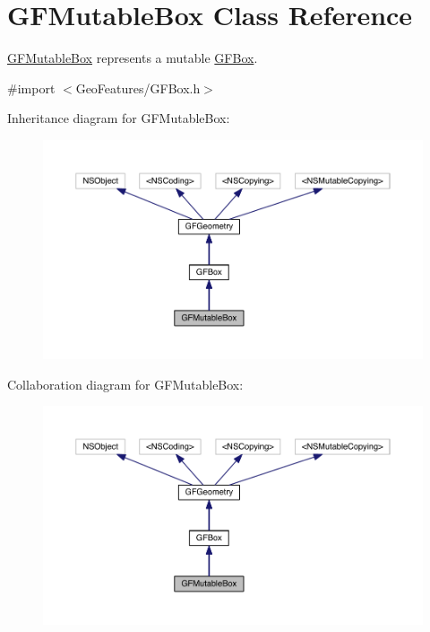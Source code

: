 \hypertarget{interface_g_f_mutable_box}{}\section{G\+F\+Mutable\+Box Class Reference}
\label{interface_g_f_mutable_box}


\hyperlink{interface_g_f_mutable_box}{G\+F\+Mutable\+Box} represents a mutable \hyperlink{interface_g_f_box}{G\+F\+Box}.  




{\ttfamily \#import $<$Geo\+Features/\+G\+F\+Box.\+h$>$}



Inheritance diagram for G\+F\+Mutable\+Box\+:
\nopagebreak
\begin{figure}[H]
\begin{center}
\leavevmode
\includegraphics[width=350pt]{interface_g_f_mutable_box__inherit__graph}
\end{center}
\end{figure}


Collaboration diagram for G\+F\+Mutable\+Box\+:
\nopagebreak
\begin{figure}[H]
\begin{center}
\leavevmode
\includegraphics[width=350pt]{interface_g_f_mutable_box__coll__graph}
\end{center}
\end{figure}
